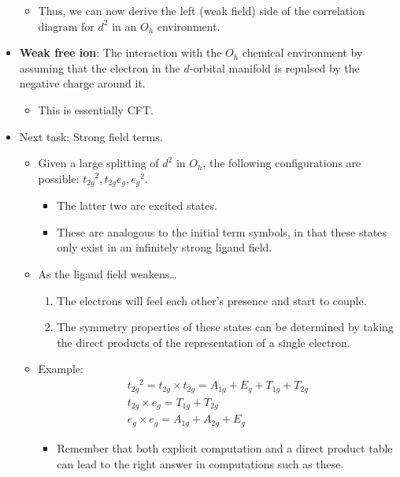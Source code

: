 \documentclass[../notes.tex]{subfiles}
\begin{document}
\begin{itemize}
\begin{itemize}
        \item Thus, we can now derive the left (weak field) side of the correlation diagram for $d^2$ in an $O_h$ environment.
    \end{itemize}
    \item \textbf{Weak free ion}: The interaction with the $O_h$ chemical environment by assuming that the electron in the $d$-orbital manifold is repulsed by the negative charge around it.
    \begin{itemize}
        \item This is essentially CFT.
    \end{itemize}
    \item Next task: Strong field terms.
    \begin{itemize}
        \item Given a large splitting of $d^2$ in $O_h$, the following configurations are possible: ${t_{2g}}^2,t_{2g}e_g,{e_g}^2$.
        \begin{itemize}
            \item The latter two are excited states.
            \item These are analogous to the initial term symbols, in that these states only exist in an infinitely strong ligand field.
        \end{itemize}
        \item As the ligand field weakens\dots
        \begin{enumerate}
            \item The electrons will feel each other's presence and start to couple.
            \item The symmetry properties of these states can be determined by taking the direct products of the representation of a single electron.
        \end{enumerate}
        \item Example:
        \begin{gather*}
            {t_{2g}}^2 = t_{2g}\times t_{2g} = A_{1g}+E_g+T_{1g}+T_{2g}\\
            t_{2g}\times e_g = T_{1g}+T_{2g}\\
            e_g\times e_g = A_{1g}+A_{2g}+E_g
        \end{gather*}
        \begin{itemize}
            \item Remember that both explicit computation and a direct product table can lead to the right answer in computations such as these.
        \end{itemize}

\end{itemize}
\end{itemize}
\end{document}
